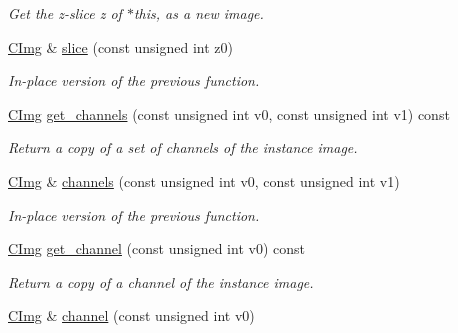 \begin{DoxyCompactItemize}
\begin{DoxyCompactList}\small\item\em Get the z-\/slice {\itshape z} of $\ast$this, as a new image. \end{DoxyCompactList}\item 
\hypertarget{structcimg__library_1_1_c_img_a312cc5fa661410c0fc1b398a7ad26d91}{\hyperlink{structcimg__library_1_1_c_img}{C\-Img} \& \hyperlink{structcimg__library_1_1_c_img_a312cc5fa661410c0fc1b398a7ad26d91}{slice} (const unsigned int z0)}\label{structcimg__library_1_1_c_img_a312cc5fa661410c0fc1b398a7ad26d91}

\begin{DoxyCompactList}\small\item\em In-\/place version of the previous function. \end{DoxyCompactList}\item 
\hypertarget{structcimg__library_1_1_c_img_a9a5652257b71feb82108388cee00813b}{\hyperlink{structcimg__library_1_1_c_img}{C\-Img} \hyperlink{structcimg__library_1_1_c_img_a9a5652257b71feb82108388cee00813b}{get\-\_\-channels} (const unsigned int v0, const unsigned int v1) const }\label{structcimg__library_1_1_c_img_a9a5652257b71feb82108388cee00813b}

\begin{DoxyCompactList}\small\item\em Return a copy of a set of channels of the instance image. \end{DoxyCompactList}\item 
\hypertarget{structcimg__library_1_1_c_img_a4697340cb41537695c29037889042413}{\hyperlink{structcimg__library_1_1_c_img}{C\-Img} \& \hyperlink{structcimg__library_1_1_c_img_a4697340cb41537695c29037889042413}{channels} (const unsigned int v0, const unsigned int v1)}\label{structcimg__library_1_1_c_img_a4697340cb41537695c29037889042413}

\begin{DoxyCompactList}\small\item\em In-\/place version of the previous function. \end{DoxyCompactList}\item 
\hypertarget{structcimg__library_1_1_c_img_a9a96c001ff0f5ecd35ac1d1a3230c03b}{\hyperlink{structcimg__library_1_1_c_img}{C\-Img} \hyperlink{structcimg__library_1_1_c_img_a9a96c001ff0f5ecd35ac1d1a3230c03b}{get\-\_\-channel} (const unsigned int v0) const }\label{structcimg__library_1_1_c_img_a9a96c001ff0f5ecd35ac1d1a3230c03b}

\begin{DoxyCompactList}\small\item\em Return a copy of a channel of the instance image. \end{DoxyCompactList}\item 
\hypertarget{structcimg__library_1_1_c_img_a06ad2e9421683d330c2e94de93a27ea8}{\hyperlink{structcimg__library_1_1_c_img}{C\-Img} \& \hyperlink{structcimg__library_1_1_c_img_a06ad2e9421683d330c2e94de93a27ea8}{channel} (const unsigned int v0)}\label{structcimg__library_1_1_c_img_a06ad2e9421683d330c2e94de93a27ea8}


\end{DoxyCompactItemize}
